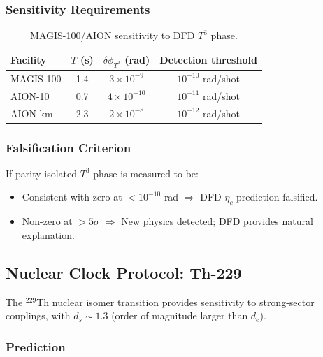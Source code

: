 \subsubsection{Sensitivity Requirements}

\begin{table}[h]
\centering
\caption{MAGIS-100/AION sensitivity to DFD $T^3$ phase.}\label{tab:mwi-sensitivity}
\begin{tabular}{lccc}
\toprule
Facility & $T$ (s) & $\delta\phi_{T^3}$ (rad) & Detection threshold \\
\midrule
MAGIS-100 & 1.4 & $3 \times 10^{-9}$ & $10^{-10}$ rad/shot \\
AION-10 & 0.7 & $4 \times 10^{-10}$ & $10^{-11}$ rad/shot \\
AION-km & 2.3 & $2 \times 10^{-8}$ & $10^{-12}$ rad/shot \\
\bottomrule
\end{tabular}
\end{table}

\subsubsection{Falsification Criterion}

If parity-isolated $T^3$ phase is measured to be:
\begin{itemize}
\item Consistent with zero at $< 10^{-10}$ rad $\Rightarrow$ DFD $\eta_c$ prediction falsified.
\item Non-zero at $> 5\sigma$ $\Rightarrow$ New physics detected; DFD provides natural explanation.
\end{itemize}

\subsection{Nuclear Clock Protocol: Th-229}\label{app:proto-nuclear}

The ${}^{229}$Th nuclear isomer transition provides sensitivity to strong-sector 
couplings, with $d_s \sim 1.3$ (order of magnitude larger than $d_e$).

\subsubsection{Prediction}

